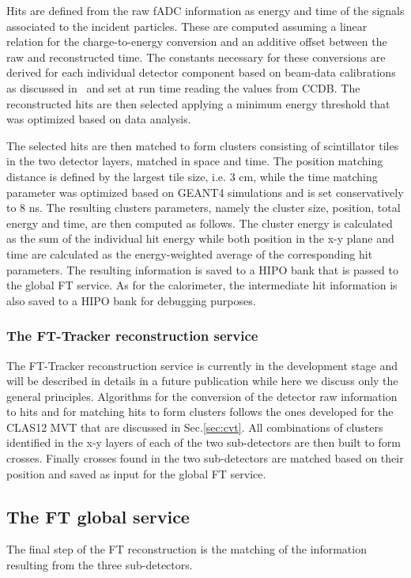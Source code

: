 Hits are defined from the raw fADC information as energy and time of the signals associated to the incident particles. These are computed assuming a linear relation for the charge-to-energy conversion and an additive offset between the raw and reconstructed time. The constants necessary for these conversions are derived for each individual detector component based on beam-data calibrations as discussed in~\cite{ft-nim} and set at run time reading the values from CCDB. The reconstructed hits are then selected applying a minimum energy threshold that was optimized based on data analysis.

The selected hits are then matched to form clusters consisting of scintillator tiles in the two detector layers, matched in space and time. The position matching distance is defined by the largest tile size, i.e. 3 cm, while the time matching parameter was optimized based on GEANT4 simulations and is set conservatively to 8 ns. The resulting clusters parameters, namely the cluster size, position, total energy and time, are then computed as follows. The cluster energy is calculated as the sum of the individual hit energy while both position in the x-y  plane and time are calculated as the energy-weighted average of the corresponding hit parameters. The resulting information is saved to a HIPO bank that is passed to the global FT service. As for the calorimeter, the intermediate hit information is also saved to a HIPO bank for debugging purposes.


\subsubsection{The FT-Tracker reconstruction service}
The FT-Tracker reconstruction service is currently in the development stage and will be described in details in a future publication while here we discuss only the general principles.
Algorithms for the conversion of the detector raw information to hits and for matching hits to form clusters follows the ones developed for the CLAS12 MVT that are discussed in Sec.\ref{sec:cvt}. All combinations of clusters identified in the x-y layers of each of the two sub-detectors are then built to form crosses. Finally crosses found in the two sub-detectors are matched based on their position and saved as input for the global FT service.

\subsection{The FT global service}
The final step of the FT reconstruction is the matching of the information resulting from the three sub-detectors.


